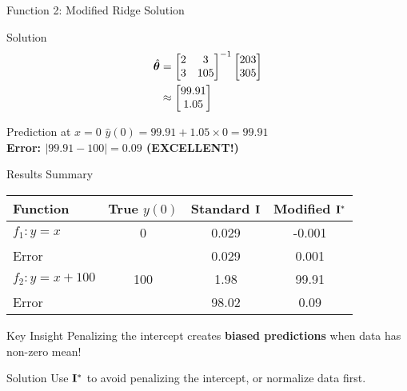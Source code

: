 \documentclass{beamer}
\begin{document}
\begin{frame}{Function 2: Modified Ridge Solution}
\begin{codebox}{Solution}
\begin{align}
\hat{\boldsymbol{\theta}} &= \begin{bmatrix} 2 & 3 \\ 3 & 105 \end{bmatrix}^{-1} \begin{bmatrix} 203 \\ 305 \end{bmatrix} \\
&\approx \begin{bmatrix} 99.91 \\ 1.05 \end{bmatrix}
\end{align}
\end{codebox}
\pause

\begin{theorembox}{Prediction at $x=0$}
$\hat{y}(0) = 99.91 + 1.05 \times 0 = 99.91$ \\
{\color{green}\textbf{Error: $|99.91 - 100| = 0.09$ (EXCELLENT!)}}
\end{theorembox}
\end{frame}

\begin{frame}{Results Summary}
\begin{table}
\centering
\begin{tabular}{|l|c|c|c|}
\hline
\textbf{Function} & \textbf{True $y(0)$} & \textbf{Standard $\mathbf{I}$} & \textbf{Modified $\mathbf{I}^*$} \\
\hline
$f_1: y = x$ & 0 & 0.029 & -0.001 \\
Error & & 0.029 & \color{green}0.001 \\
\hline
$f_2: y = x + 100$ & 100 & 1.98 & 99.91 \\
Error & & \color{red}98.02 & \color{green}0.09 \\
\hline
\end{tabular}
\end{table}
\pause

\begin{alertbox}{Key Insight}
Penalizing the intercept creates \textbf{biased predictions} when data has non-zero mean!
\end{alertbox}
\pause

\begin{keypointsbox}{Solution}
Use $\mathbf{I}^*$ to avoid penalizing the intercept, or normalize data first.
\end{keypointsbox}
\end{frame}
\end{document}
